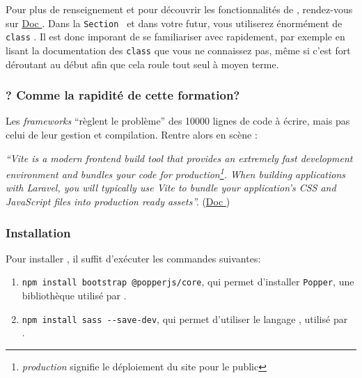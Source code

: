 \documentclass[internal]{nhitec_design}
\begin{document}
Pour plus de renseignement et pour découvrir les fonctionnalités de \bs{}, rendez-vous sur \href{https://getbootstrap.com/docs/5.3/getting-started/introduction/}{Doc \bs{}}. Dans la \texttt{Section } et dans votre futur, vous utiliserez énormément de \verb|class| \bs. Il est donc imporant de se familiariser avec rapidement, par exemple en lisant la documentation des \verb|class| que vous ne connaissez pas, même si c'est fort déroutant au début afin que cela roule tout seul à moyen terme.

\subsubsection[Vite? Comme la rapidité de cette formation?][laravel.com/docs/10.x/vite\#introduction]{\vite{}? Comme la rapidité de cette formation?}
Les \textit{frameworks} ``règlent le problème'' des 10000 lignes de code à écrire, mais pas celui de leur gestion et compilation. Rentre alors en scène \vite:

\textit{``Vite is a modern frontend build tool that provides an extremely fast development environment and bundles your code for production\footnote{\textit{production} signifie le déploiement du site pour le public}. When building applications with Laravel, you will typically use Vite to bundle your application's CSS and JavaScript files into production ready assets''.} (\href{https://laravel.com/docs/10.x/vite#introduction}{Doc \laravel{}})
\subsubsection{Installation}

Pour installer \bs{}, il suffit d'exécuter les commandes suivantes:
\begin{enumerate}
    \item \verb|npm install bootstrap @popperjs/core|, qui permet d'installer \verb|Popper|, une bibliothèque \js{} utilisé par \bs{}.
    \item \verb|npm install sass --save-dev|, qui permet d'utiliser le langage \sass{}, utilisé par \\ \bs{}.
\end{enumerate}
\end{document}
